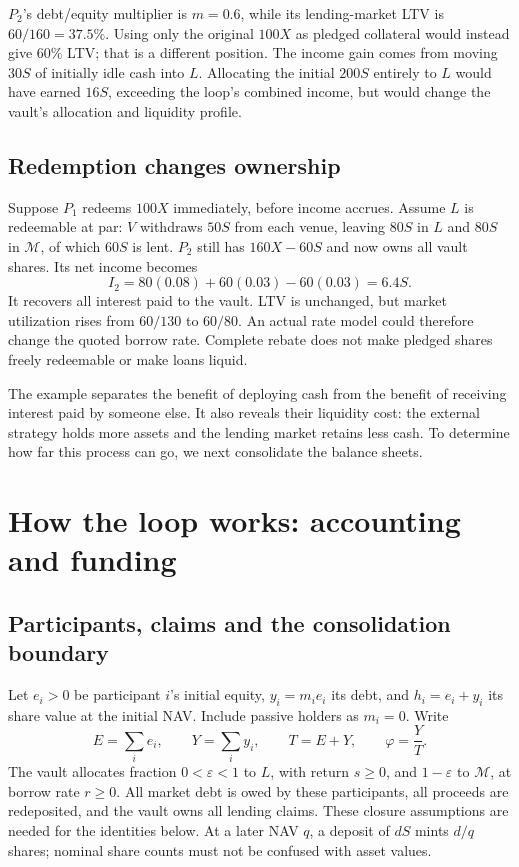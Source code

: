 \documentclass[12pt,oneside]{article}
\begin{document}
$P_2$'s debt/equity multiplier is $m=0.6$, while its lending-market
LTV is $60/160=37.5\%$. Using only the original $100X$ as pledged
collateral would instead give $60\%$ LTV; that is a different position.
The income gain comes from moving $30S$ of initially idle cash into
$L$. Allocating the initial $200S$ entirely to $L$ would have earned
$16S$, exceeding the loop's combined income, but would change the
vault's allocation and liquidity profile.

\subsection{Redemption changes ownership}
Suppose $P_1$ redeems $100X$ immediately, before income accrues.
Assume $L$ is redeemable at par: $V$ withdraws $50S$ from each venue,
leaving $80S$ in $L$ and $80S$ in $\mathcal M$, of which $60S$ is
lent. $P_2$ still has $160X-60S$ and now owns all vault shares. Its
net income becomes
\[
 I_2=80(0.08)+60(0.03)-60(0.03)=6.4S.
\]
It recovers all interest paid to the vault. LTV is unchanged, but
market utilization rises from $60/130$ to $60/80$. An actual rate
model could therefore change the quoted borrow rate. Complete rebate
does not make pledged shares freely redeemable or make loans liquid.

The example separates the benefit of deploying cash from the benefit
of receiving interest paid by someone else. It also reveals their
liquidity cost: the external strategy holds more assets and the lending
market retains less cash. To determine how far this process can go,
we next consolidate the balance sheets.

\section{How the loop works: accounting and funding}
\label{sec:accounting}
\subsection{Participants, claims and the consolidation boundary}
Let $e_i>0$ be participant $i$'s initial equity, $y_i=m_i e_i$ its debt,
and $h_i=e_i+y_i$ its share value at the initial NAV. Include passive
holders as $m_i=0$. Write
\[
 E=\sum_i e_i,\qquad Y=\sum_i y_i,\qquad T=E+Y,\qquad
 \varphi=\frac{Y}{T}.
\]
The vault allocates fraction $0<\varepsilon<1$ to $L$, with return
$s\geq0$, and $1-\varepsilon$ to $\mathcal M$, at borrow rate
$r\geq0$. All market debt is
owed by these participants, all proceeds are redeposited, and the vault
owns all lending claims. These closure assumptions are needed for the
identities below. At a later NAV $q$, a deposit of $dS$ mints $d/q$
shares; nominal share counts must not be confused with asset values.
\end{document}
